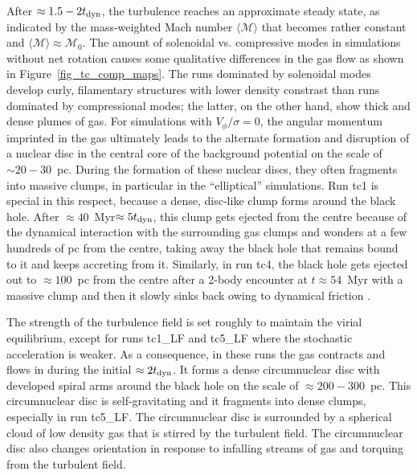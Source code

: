 \documentclass[a4paper,fleqn,usenatbib]{mnras}
\begin{document}
After $\approx1.5-2 t_{\rm dyn}$, the turbulence reaches an approximate steady state, as indicated by the mass-weighted Mach number $\langle \mathcal{M} \rangle$ that becomes rather constant and $\langle \mathcal{M} \rangle \approx \mathcal{M}_{0}$.
The amount of solenoidal vs. compressive modes in simulations without net rotation causes some qualitative differences in the gas flow as shown in Figure~\ref{fig_tc_comp_maps}.
The runs dominated by solenoidal modes develop curly, filamentary structures with lower density constrast than runs dominated by compressional modes; the latter, on the other hand, show thick and dense plumes of gas.
For simulations with $V_{\phi}/\sigma = 0$, the angular momentum imprinted in the gas ultimately leads to the alternate formation and disruption of a nuclear disc in the central core of the background potential on the scale of $\sim 20-30$~pc.
During the formation of these nuclear discs, they often fragments into massive clumps, in particular in the ``elliptical'' simulations.
Run tc1 is special in this respect, because a dense, disc-like clump forms around the black hole.
After $\approx 40$~Myr$\approx 5 t_{\rm  dyn}$, this clump gets ejected from the centre because of the dynamical interaction with the surrounding gas clumps and wonders at a few hundreds of pc from the centre, taking away the black hole that remains bound to it and keeps accreting from it.
Similarly, in run tc4, the black hole gets ejected out to $\approx 100$~pc from the centre after a 2-body encounter at $t\approx 54$~Myr with a massive clump and then it slowly sinks back owing to dynamical friction \citep[see e.g.][]{fiacconi+13,roskar+15}.

The strength of the turbulence field is set roughly to maintain the virial equilibrium, except for runs tc1\_LF and tc5\_LF where the stochastic acceleration is weaker.
As a consequence, in these runs the gas contracts and flows in during the initial $\approx 2 t_{\rm dyn}$.
It forms a dense circumnuclear disc with developed spiral arms around the black hole on the scale of $\approx200-300$~pc.
This circumnuclear disc is self-gravitating and it fragments into dense clumps, especially in run tc5\_LF.
The circumnuclear disc is surrounded by a spherical cloud of low density gas that is stirred by the turbulent field.
The circumnuclear disc also changes orientation in response to infalling streams of gas and torquing from the turbulent field.
\end{document}
